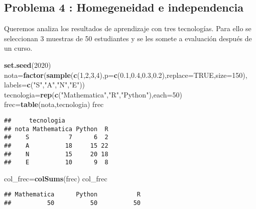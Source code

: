 \documentclass[
]{article}
\newenvironment{Shaded}{\begin{snugshade}}{\end{snugshade}}
\newcommand{\DataTypeTok}[1]{\textcolor[rgb]{0.13,0.29,0.53}{#1}}
\newcommand{\DecValTok}[1]{\textcolor[rgb]{0.00,0.00,0.81}{#1}}
\newcommand{\FloatTok}[1]{\textcolor[rgb]{0.00,0.00,0.81}{#1}}
\newcommand{\KeywordTok}[1]{\textcolor[rgb]{0.13,0.29,0.53}{\textbf{#1}}}
\newcommand{\NormalTok}[1]{#1}
\newcommand{\OtherTok}[1]{\textcolor[rgb]{0.56,0.35,0.01}{#1}}
\newcommand{\StringTok}[1]{\textcolor[rgb]{0.31,0.60,0.02}{#1}}
\begin{document}
\hypertarget{problema-4-homegeneidad-e-independencia}{%
\subsection{Problema 4 : Homegeneidad e
independencia}\label{problema-4-homegeneidad-e-independencia}}

Queremos analiza los resultados de aprendizaje con tres tecnologías.
Para ello se seleccionan 3 muestras de 50 estudiantes y se les somete a
evaluación después de un curso.

\begin{Shaded}
\begin{Highlighting}[]
\KeywordTok{set.seed}\NormalTok{(}\DecValTok{2020}\NormalTok{)}
\NormalTok{nota=}\KeywordTok{factor}\NormalTok{(}\KeywordTok{sample}\NormalTok{(}\KeywordTok{c}\NormalTok{(}\DecValTok{1}\NormalTok{,}\DecValTok{2}\NormalTok{,}\DecValTok{3}\NormalTok{,}\DecValTok{4}\NormalTok{),}\DataTypeTok{p=}\KeywordTok{c}\NormalTok{(}\FloatTok{0.1}\NormalTok{,}\FloatTok{0.4}\NormalTok{,}\FloatTok{0.3}\NormalTok{,}\FloatTok{0.2}\NormalTok{),}\DataTypeTok{replace=}\OtherTok{TRUE}\NormalTok{,}\DataTypeTok{size=}\DecValTok{150}\NormalTok{),}
            \DataTypeTok{labels=}\KeywordTok{c}\NormalTok{(}\StringTok{"S"}\NormalTok{,}\StringTok{"A"}\NormalTok{,}\StringTok{"N"}\NormalTok{,}\StringTok{"E"}\NormalTok{))}
\NormalTok{tecnologia=}\KeywordTok{rep}\NormalTok{(}\KeywordTok{c}\NormalTok{(}\StringTok{"Mathematica"}\NormalTok{,}\StringTok{"R"}\NormalTok{,}\StringTok{"Python"}\NormalTok{),}\DataTypeTok{each=}\DecValTok{50}\NormalTok{)}
\NormalTok{frec=}\KeywordTok{table}\NormalTok{(nota,tecnologia)}
\NormalTok{frec}
\end{Highlighting}
\end{Shaded}

\begin{verbatim}
##     tecnologia
## nota Mathematica Python  R
##    S           7      6  2
##    A          18     15 22
##    N          15     20 18
##    E          10      9  8
\end{verbatim}

\begin{Shaded}
\begin{Highlighting}[]
\NormalTok{col_frec=}\KeywordTok{colSums}\NormalTok{(frec)}
\NormalTok{col_frec}
\end{Highlighting}
\end{Shaded}

\begin{verbatim}
## Mathematica      Python           R 
##          50          50          50
\end{verbatim}
\end{document}
